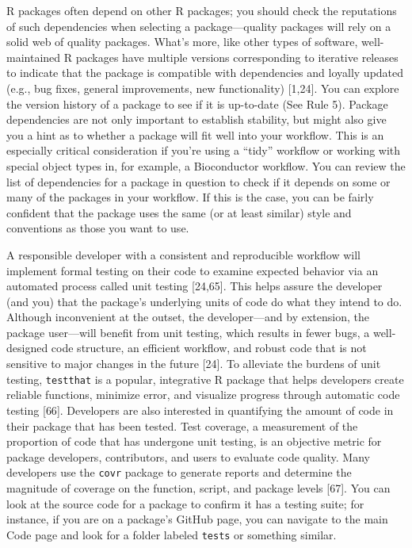 \documentclass[10pt,letterpaper]{article}
\begin{document}
R packages often depend on other R packages; you should check the
reputations of such dependencies when selecting a package---quality
packages will rely on a solid web of quality packages. What's more, like
other types of software, well-maintained R packages have multiple
versions corresponding to iterative releases to indicate that the
package is compatible with dependencies and loyally updated (e.g., bug
fixes, general improvements, new functionality) {[}1,24{]}. You can
explore the version history of a package to see if it is up-to-date (See
Rule 5). Package dependencies are not only important to establish
stability, but might also give you a hint as to whether a package will
fit well into your workflow. This is an especially critical
consideration if you're using a ``tidy'' workflow or working with
special object types in, for example, a Bioconductor workflow. You can
review the list of dependencies for a package in question to check if it
depends on some or many of the packages in your workflow. If this is the
case, you can be fairly confident that the package uses the same (or at
least similar) style and conventions as those you want to use.

A responsible developer with a consistent and reproducible workflow will
implement formal testing on their code to examine expected behavior via
an automated process called unit testing {[}24,65{]}. This helps assure
the developer (and you) that the package's underlying units of code do
what they intend to do. Although inconvenient at the outset, the
developer---and by extension, the package user---will benefit from unit
testing, which results in fewer bugs, a well-designed code structure, an
efficient workflow, and robust code that is not sensitive to major
changes in the future {[}24{]}. To alleviate the burdens of unit
testing, \texttt{testthat} is a popular, integrative R package that
helps developers create reliable functions, minimize error, and
visualize progress through automatic code testing {[}66{]}. Developers
are also interested in quantifying the amount of code in their package
that has been tested. Test coverage, a measurement of the proportion of
code that has undergone unit testing, is an objective metric for package
developers, contributors, and users to evaluate code quality. Many
developers use the \texttt{covr} package to generate reports and
determine the magnitude of coverage on the function, script, and package
levels {[}67{]}. You can look at the source code for a package to
confirm it has a testing suite; for instance, if you are on a package's
GitHub page, you can navigate to the main Code page and look for a
folder labeled \texttt{tests} or something similar.
\end{document}
